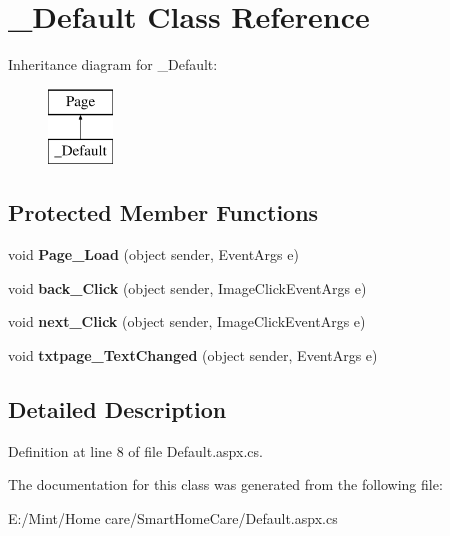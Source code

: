 \hypertarget{class___default}{\section{\-\_\-\-Default Class Reference}
\label{class___default}
}
Inheritance diagram for \-\_\-\-Default\-:\begin{figure}[H]
\begin{center}
\leavevmode
\includegraphics[height=2.000000cm]{class___default}
\end{center}
\end{figure}
\subsection*{Protected Member Functions}
\begin{DoxyCompactItemize}
\item 
\hypertarget{class___default_adacf7c92cb8d02f22ce02f0ceed897c1}{void {\bfseries Page\-\_\-\-Load} (object sender, Event\-Args e)}\label{class___default_adacf7c92cb8d02f22ce02f0ceed897c1}

\item 
\hypertarget{class___default_acf1cf3360aeecb29886ab98e0065144b}{void {\bfseries back\-\_\-\-Click} (object sender, Image\-Click\-Event\-Args e)}\label{class___default_acf1cf3360aeecb29886ab98e0065144b}

\item 
\hypertarget{class___default_a599b0fe5110ff03bca7be129c1f150a3}{void {\bfseries next\-\_\-\-Click} (object sender, Image\-Click\-Event\-Args e)}\label{class___default_a599b0fe5110ff03bca7be129c1f150a3}

\item 
\hypertarget{class___default_af1064f05babee44e874a165350cd0b9e}{void {\bfseries txtpage\-\_\-\-Text\-Changed} (object sender, Event\-Args e)}\label{class___default_af1064f05babee44e874a165350cd0b9e}

\end{DoxyCompactItemize}


\subsection{Detailed Description}


Definition at line 8 of file Default.\-aspx.\-cs.



The documentation for this class was generated from the following file\-:\begin{DoxyCompactItemize}
\item 
E\-:/\-Mint/\-Home care/\-Smart\-Home\-Care/Default.\-aspx.\-cs\end{DoxyCompactItemize}
